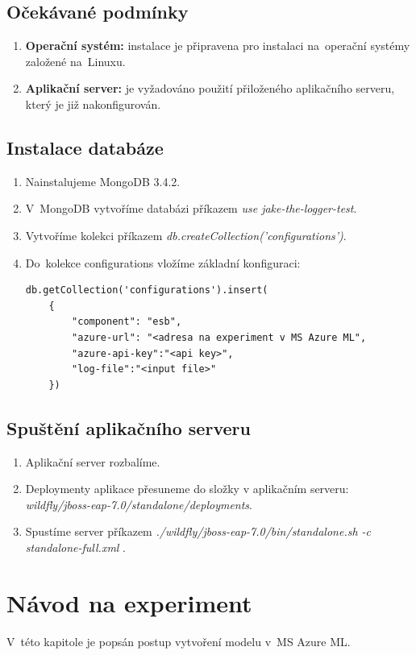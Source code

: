 \documentclass[thesis=M,czech]{FITthesis}[2012/10/20]
\begin{document}
	\section{Očekávané podmínky}
		\begin{enumerate}
			\item \textbf{Operační systém:} instalace je připravena pro instalaci na~operační systémy založené na~Linuxu.
			\item \textbf{Aplikační server:} je vyžadováno použití přiloženého aplikačního serveru, který je již nakonfigurován.
		\end{enumerate}
	
	\section{Instalace databáze}
		\begin{enumerate}
			\item Nainstalujeme MongoDB 3.4.2.
			\item V~MongoDB vytvoříme databázi  příkazem \textit{use jake-the-logger-test}.
			\item Vytvoříme kolekci příkazem \textit{db.createCollection('configurations')}.
			\item Do~kolekce configurations vložíme základní konfiguraci:
			\begin{lstlisting}[caption={Základní konfigurace}, label={lst:basic_conf}]
db.getCollection('configurations').insert(
	{
		"component": "esb",
		"azure-url": "<adresa na experiment v MS Azure ML",
		"azure-api-key":"<api key>",
		"log-file":"<input file>"
	})
			\end{lstlisting}
		\end{enumerate}
	
	\section{Spuštění aplikačního serveru}
		\begin{enumerate}
			\item Aplikační server rozbalíme.
			\item Deploymenty aplikace přesuneme do složky v aplikačním serveru: \textit{wildfly/jboss-eap-7.0/standalone/deployments}.
			\item Spustíme server příkazem \textit{./wildfly/jboss-eap-7.0/bin/standalone.sh -c standalone-full.xml }.
		\end{enumerate}
	

\chapter{Návod na experiment}
	V~této kapitole je popsán postup vytvoření modelu v~MS Azure ML.
	
\end{document}
